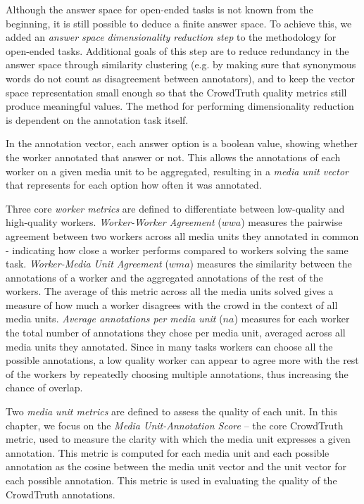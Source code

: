 Although the answer space for open-ended tasks is not known from the beginning, it is still possible to deduce a finite answer space. To achieve this, we added an \textit{answer space dimensionality reduction step} to the methodology for open-ended tasks. Additional goals of this step are to reduce redundancy in the answer space through similarity clustering (e.g. by making sure that synonymous words do not count as disagreement between annotators), and to keep the vector space representation small enough so that the CrowdTruth quality metrics still produce meaningful values. The method for performing dimensionality reduction is dependent on the annotation task itself. %


In the annotation vector, each answer option is a boolean value, showing whether the worker annotated that answer or not. This allows the annotations of each worker on a given media unit to be aggregated, resulting in a \textit{media unit vector} that represents for each option how often it was annotated.

Three core \textit{worker metrics} are defined to differentiate between low-quality and high-quality workers. \emph{Worker-Worker Agreement} ($wwa$) measures the pairwise agreement between two workers across all media units they annotated in common - indicating how close a worker performs compared to workers solving the same task. \emph{Worker-Media Unit Agreement} ($wma$) measures the similarity between the annotations of a worker and the aggregated annotations of the rest of the workers. The average of this metric across all the media units solved gives a measure of how much a worker disagrees with the crowd in the context of all media units. \emph{Average annotations per media unit} ($na$) measures for each worker the total number of annotations they chose per media unit, averaged across all media units they annotated. Since in many tasks workers can choose all the possible annotations, a low quality worker can appear to agree more with the rest of the workers by repeatedly choosing multiple annotations, thus increasing the chance of overlap.

Two \textit{media unit metrics} are defined to assess the quality of each unit. In this chapter, we focus on the \emph{Media Unit-Annotation Score} -- the core CrowdTruth metric, used to measure the clarity with which the media unit expresses a given annotation. This metric is computed for each media unit and each possible annotation as the cosine between the media unit vector and the unit vector for each possible annotation.  This metric is used in evaluating the quality of the CrowdTruth annotations.


